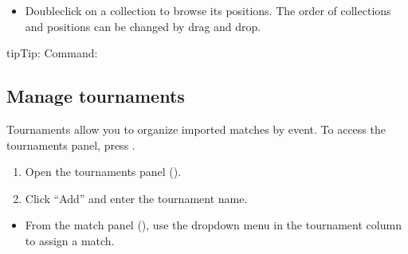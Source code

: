 \documentclass[letterpaper,10pt,english]{sphinxmanual}
\begin{document}
\sphinxAtStartPar
{}
\begin{itemize}
\item {} 
\sphinxAtStartPar
Double\sphinxhyphen{}click on a collection to browse its positions. The order of collections and positions can be changed by drag and drop.

\end{itemize}

\begin{sphinxadmonition}{tip}{Tip:}
\sphinxAtStartPar
Command: 
\end{sphinxadmonition}


\subsection{Manage tournaments}
\label{\detokenize{guide_utilisateur:gerer-les-tournois}}
\sphinxAtStartPar
Tournaments allow you to organize imported matches by event. To access the tournaments panel, press .

\sphinxAtStartPar
{}
\begin{enumerate}
%
\item {} 
\sphinxAtStartPar
Open the tournaments panel ().

\item {} 
\sphinxAtStartPar
Click “Add” and enter the tournament name.

\end{enumerate}

\sphinxAtStartPar
{}
\begin{itemize}
\item {} 
\sphinxAtStartPar
From the match panel (), use the dropdown menu in the tournament column to assign a match.

\end{itemize}
\end{document}
